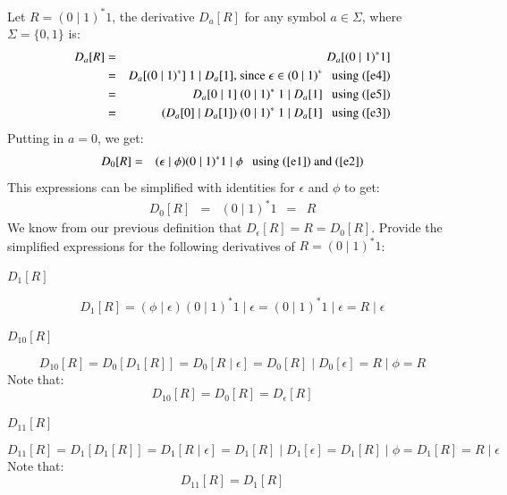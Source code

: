 \documentclass[12pt]{article}
\begin{document}
\begin{exe}
   Let $R = (0 \mid 1)^\ast 1$, the derivative $D_a[R]$ for any symbol $a \in \Sigma$, 
   where $\Sigma = \{0,1\}$ is:
   \begin{eqnarray}
   D_a[R] & = & D_a[ (0 \mid 1)^\ast 1 ] \nonumber \\
   & = & D_a[ (0 \mid 1)^\ast ]\ 1 \mid D_a[ 1 ] \textrm{,\ since $\epsilon \in (0 \mid 1)^\ast$} 
   \textrm{\ \ \ using~(\ref{e4})} \nonumber \\
   & = & D_a[ 0 \mid 1 ]\ (0 \mid 1)^\ast\ 1 \mid D_a[ 1 ] 
   \textrm{\ \ \ using~(\ref{e5})} \nonumber \\
   & = & ( D_a[0] \mid D_a[1] )\ (0 \mid 1)^\ast\ 1 \mid D_a[1] 
   \textrm{\ \ \ using~(\ref{e3})} \nonumber
   \end{eqnarray}
   Putting in $a = 0$, we get:
   \begin{eqnarray}
   D_0[R] & = & (\epsilon \mid \phi) (0 \mid 1)^\ast 1 \mid \phi 
   \textrm{\ \ \ using~(\ref{e1}) and~(\ref{e2})} \nonumber
   \end{eqnarray}
   This expressions can be simplified with identities for $\epsilon$ and $\phi$ to get:
   \[ \begin{array}{lllll}
   D_0[R] & = & (0 \mid 1)^\ast 1 & = & R
   \end{array} \]
   We know from our previous definition that $D_\epsilon[R] = R = D_0[R]$. 
   Provide the simplified expressions for the following derivatives of $R = (0 \mid 1)^\ast 1$:
   
   \begin{xlist}
   
   \item $D_1[R]$
   \begin{soln}
   \[ D_1[R] = (\phi \mid \epsilon) (0 \mid 1)^\ast 1 \mid \epsilon 
	= (0 \mid 1)^\ast 1 \mid \epsilon = R \mid \epsilon \]
   \end{soln}
   
   \item $D_{10}[R]$
   \begin{soln}
   \[ D_{10}[R] = D_0 [ D_1[R] ] = D_0[ R \mid \epsilon ] = D_0[R] \mid D_0[\epsilon] = R \mid \phi = R \]
   Note that:
   \[ D_{10}[R] = D_0[R] = D_\epsilon[R] \]
   \end{soln}
   
   \item $D_{11}[R]$
   \begin{soln}
   \[ D_{11}[R] = D_1 [ D_1[R] ] = D_1[ R \mid \epsilon ] = D_1[R] \mid D_1[\epsilon] = D_1[R] \mid \phi = D_1[R] = R \mid \epsilon \]
   Note that:
   \[ D_{11}[R] = D_1[R] \]
   \end{soln}
   

\end{xlist}
\end{exe}
\end{document}
